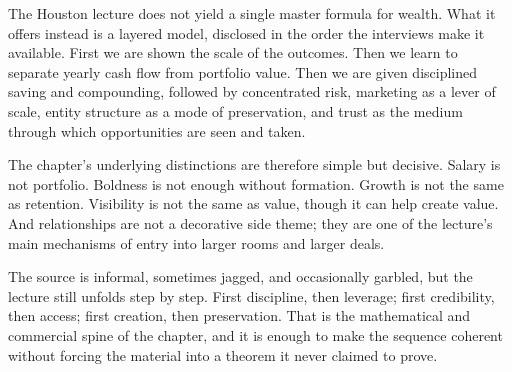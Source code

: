 The Houston lecture does not yield a single master formula for wealth. What it offers instead is a layered model, disclosed in the order the interviews make it available. First we are shown the scale of the outcomes. Then we learn to separate yearly cash flow from portfolio value. Then we are given disciplined saving and compounding, followed by concentrated risk, marketing as a lever of scale, entity structure as a mode of preservation, and trust as the medium through which opportunities are seen and taken.

The chapter's underlying distinctions are therefore simple but decisive. Salary is not portfolio. Boldness is not enough without formation. Growth is not the same as retention. Visibility is not the same as value, though it can help create value. And relationships are not a decorative side theme; they are one of the lecture's main mechanisms of entry into larger rooms and larger deals.

The source is informal, sometimes jagged, and occasionally garbled, but the lecture still unfolds step by step. First discipline, then leverage; first credibility, then access; first creation, then preservation. That is the mathematical and commercial spine of the chapter, and it is enough to make the sequence coherent without forcing the material into a theorem it never claimed to prove.